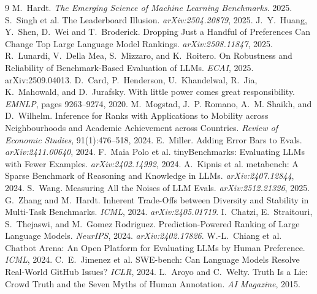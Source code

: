 \documentclass[11pt]{article}
\begin{document}
\begin{thebibliography}{9}\small
{} M.~Hardt. \emph{The Emerging Science of Machine Learning Benchmarks}. 2025.
 S.~Singh et al. The Leaderboard Illusion. \emph{arXiv:2504.20879}, 2025.
 J.~Y.~Huang, Y.~Shen, D.~Wei and T.~Broderick. Dropping Just a Handful of Preferences Can Change Top Large Language Model Rankings. \emph{arXiv:2508.11847}, 2025.
 R.~Lunardi, V.~Della Mea, S.~Mizzaro, and K.~Roitero. On Robustness and Reliability of Benchmark-Based Evaluation of LLMs. \emph{ECAI}, 2025. arXiv:2509.04013.
 D.~Card, P.~Henderson, U.~Khandelwal, R.~Jia, K.~Mahowald, and D.~Jurafsky. With little power comes great responsibility. \emph{EMNLP}, pages 9263--9274, 2020.
 M.~Mogstad, J.~P. Romano, A.~M. Shaikh, and D.~Wilhelm. Inference for Ranks with Applications to Mobility across Neighbourhoods and Academic Achievement across Countries. \emph{Review of Economic Studies}, 91(1):476--518, 2024.
 E.~Miller. Adding Error Bars to Evals. \emph{arXiv:2411.00640}, 2024.
 F.~Maia Polo et al. tinyBenchmarks: Evaluating LLMs with Fewer Examples. \emph{arXiv:2402.14992}, 2024.
 A.~Kipnis et al. metabench: A Sparse Benchmark of Reasoning and Knowledge in LLMs. \emph{arXiv:2407.12844}, 2024.
 S.~Wang. Measuring All the Noises of LLM Evals. \emph{arXiv:2512.21326}, 2025.
 G.~Zhang and M.~Hardt. Inherent Trade-Offs between Diversity and Stability in Multi-Task Benchmarks. \emph{ICML}, 2024. \emph{arXiv:2405.01719}.
 I.~Chatzi, E.~Straitouri, S.~Thejaswi, and M.~Gomez Rodriguez. Prediction-Powered Ranking of Large Language Models. \emph{NeurIPS}, 2024. \emph{arXiv:2402.17826}.
 W.-L.~Chiang et al. Chatbot Arena: An Open Platform for Evaluating LLMs by Human Preference. \emph{ICML}, 2024.
 C.~E.~Jimenez et al. SWE-bench: Can Language Models Resolve Real-World GitHub Issues? \emph{ICLR}, 2024.
 L.~Aroyo and C.~Welty. Truth Is a Lie: Crowd Truth and the Seven Myths of Human Annotation. \emph{AI Magazine}, 2015.
\end{thebibliography}
\end{document}
